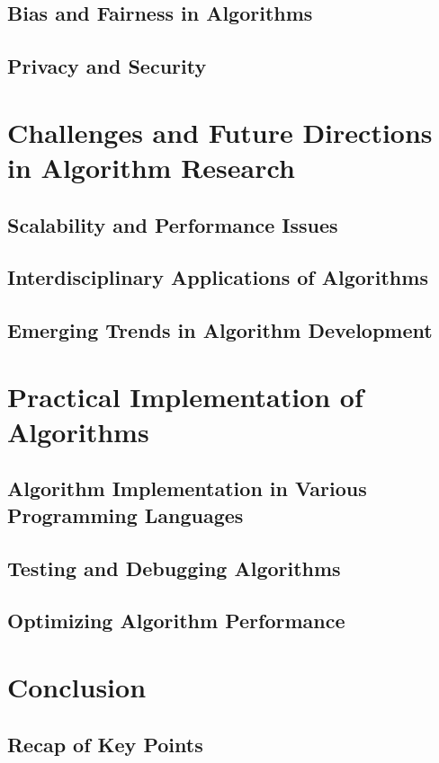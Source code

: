 \documentclass[12pt]{book} %
\begin{document}
\subsection{Bias and Fairness in Algorithms}
\subsection{Privacy and Security}

\section{Challenges and Future Directions in Algorithm Research}
\subsection{Scalability and Performance Issues}
\subsection{Interdisciplinary Applications of Algorithms}
\subsection{Emerging Trends in Algorithm Development}

\section{Practical Implementation of Algorithms}
\subsection{Algorithm Implementation in Various Programming Languages}
\subsection{Testing and Debugging Algorithms}
\subsection{Optimizing Algorithm Performance}

\section{Conclusion}
\subsection{Recap of Key Points}
\end{document}
